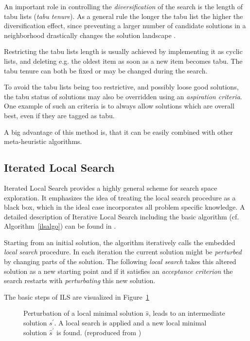 An important role in controlling the \emph{diversification} of the search is the length of tabu lists (\emph{tabu tenure}).  
As a general rule the longer the tabu list the higher the diversification effect, since preventing a larger number of candidate solutions in a neighborhood drastically changes the solution landscape \cite{blum2003metaheuristics}. 

Restricting the tabu lists length is usually achieved by implementing it as cyclic lists, and deleting e.g. the oldest item as soon as a new item becomes tabu. 
The tabu tenure can both be fixed or may be changed during the search.

To avoid the tabu lists being too restrictive, and possibly loose good solutions, the tabu status of solutions may also be overridden using an \emph{aspiration criteria}. One example of such an criteria is to always allow solutions which are overall best, even if they are tagged as tabu.

A big advantage of this method is, that it can be easily combined with other meta-heuristic algorithms.

\subsection{Iterated Local Search}\label{sec:ils}
Iterated Local Search provides a highly general scheme for search space exploration. 
It emphasizes the idea of treating the local search procedure as a black box, which in the ideal case incorporates all problem specific knowledge. 
A detailed description of Iterative Local Search including the basic algorithm (cf. Algorithm~\ref{ilsalgo}) can be found in \cite{lourencco2001iterated}.

Starting from an initial solution, the algorithm iteratively calls the embedded \emph{local search} procedure.
In each iteration the current solution might be \emph{perturbed} by changing parts of the solution. 
The following \emph{local search} takes this altered solution as a new starting point and if it satisfies an \emph{acceptance criterion} the search restarts with \emph{perturbating} this new solution. 

The basic steps of ILS are visualized in Figure~\ref{fig:fig_ils}

\begin{figure}[thpb] 
   \footnotesize
   \centering
    \def\svgwidth{0.75\textwidth}
    
    \caption[Perturbation step in ILS]{Perturbation of a local minimal solution $\hat{s}$, leads to an intermediate solution $s^\prime$. A local search is applied and a new local minimal solution $\hat{s}^\prime$ is found. (reproduced from \cite{blum2003metaheuristics})}  
     \label{fig:fig_ils}
\end{figure}

